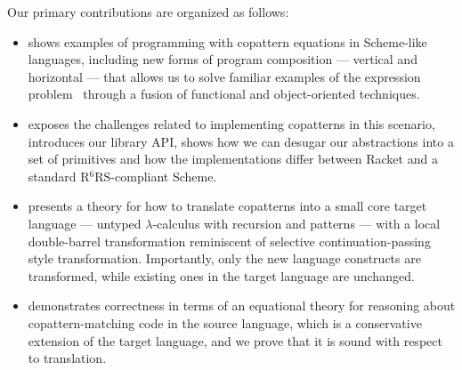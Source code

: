 Our primary contributions are organized as follows:
\begin{itemize}
\item {} shows examples of programming with copattern equations in Scheme-like languages, including new forms of program composition --- vertical and horizontal --- that allows us to solve familiar examples of the expression problem~\cite{ExpressionProblem} through a fusion of functional and object-oriented techniques.
\item {} exposes the challenges related to implementing copatterns in this scenario, introduces our library API, shows how we can desugar our abstractions into a set of primitives and how the implementations differ between Racket and a standard R${}^6$RS-compliant Scheme.
\item {} presents a theory for how to translate copatterns into a small core target language --- untyped $\lambda$-calculus with recursion and patterns --- with a local double-barrel transformation reminiscent of selective continuation-passing style transformation.
  Importantly, only the new language constructs are transformed, while existing ones in the target language are unchanged.
\item {} demonstrates correctness in terms of an equational theory for reasoning about copattern-matching code in the source language, which is a conservative extension of the target language, and we prove that it is sound with respect to translation.
\end{itemize} 


